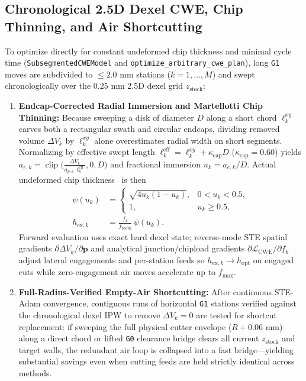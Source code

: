 \documentclass[conference]{IEEEtran}
\begin{document}
\subsection{Chronological 2.5D Dexel CWE, Chip Thinning, and Air Shortcutting}
\label{sec:cwe_physics}
To optimize directly for constant undeformed chip thickness and minimal cycle time (\texttt{SubsegmentedCWEModel} and \texttt{optimize\_\allowbreak arbitrary\_\allowbreak cwe\_\allowbreak plan}), long \texttt{G1} moves are subdivided to $\le 2.0\text{ mm}$ stations ($k=1,\dots,M$) and swept chronologically over the $0.25\text{ mm}$ 2.5D dexel grid $z_{\text{stock}}$:
\begin{enumerate}
  \item \textbf{Endcap-Corrected Radial Immersion and Martellotti Chip Thinning:} Because sweeping a disk of diameter $D$ along a short chord $\ell_k^{xy}$ carves both a rectangular swath and circular endcaps, dividing removed volume $\Delta V_k$ by $\ell_k^{xy}$ alone overestimates radial width on short segments. Normalizing by effective swept length $\ell_k^{\text{eff}} = \ell_k^{xy} + \kappa_{\text{cap}} D$ ($\kappa_{\text{cap}} = 0.60$) yields $a_{e,k} = \operatorname{clip}\!\big(\frac{\Delta V_k}{a_{p,k}\,\ell_k^{\text{eff}}}, 0, D\big)$ and fractional immersion $u_k = a_{e,k}/D$. Actual undeformed chip thickness~\cite{martellotti1941milling} is then
  \begin{equation}
    \begin{aligned}
      \psi(u_k) &= \begin{cases}
        \sqrt{4 u_k (1 - u_k)}, & 0 < u_k < 0.5, \\
        1, & u_k \ge 0.5,
      \end{cases} \\
      h_{\text{ex},k} &= \frac{f_k}{f_{\text{tooth}}}\,\psi(u_k).
    \end{aligned}
    \label{eq:chipload}
  \end{equation}
  Forward evaluation uses exact hard dexel state; reverse-mode STE spatial gradients $\partial \Delta V_k / \partial \mathbf{p}$ and analytical junction/chipload gradients $\partial \mathcal{L}_{\text{CWE}} / \partial f_k$ adjust lateral engagements and per-station feeds so $h_{\text{ex},k} \to h_{\text{opt}}$ on engaged cuts while zero-engagement air moves accelerate up to $f_{\max}$.
  \item \textbf{Full-Radius-Verified Empty-Air Shortcutting:} After continuous STE-Adam convergence, contiguous runs of horizontal \texttt{G1} stations verified against the chronological dexel IPW to remove $\Delta V_k = 0$ are tested for shortcut replacement: if sweeping the full physical cutter envelope ($R + 0.06\text{ mm}$) along a direct chord or lifted \texttt{G0} clearance bridge clears all current $z_{\text{stock}}$ and target walls, the redundant air loop is collapsed into a fast bridge—yielding substantial savings even when cutting feeds are held strictly identical across methods.
\end{enumerate}
\end{document}
